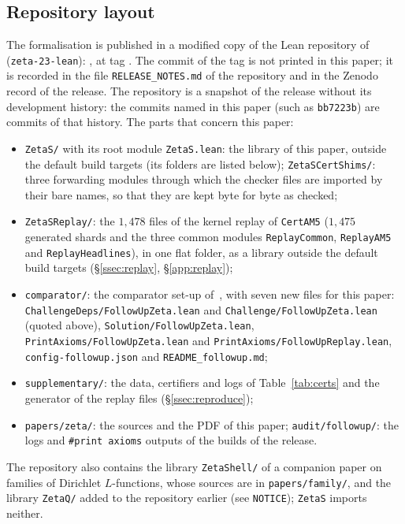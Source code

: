 \subsection{Repository layout}\label{app:layout}
The formalisation is published in a modified copy of the Lean repository of~\cite{AF} (\texttt{zeta-23-lean}): \repourl, at tag
\repotag. The commit of the tag is not printed in this paper; it is recorded in the file \texttt{RELEASE\_NOTES.md} of the repository and in
the Zenodo record of the release. The repository is a snapshot of the release without its development history: the commits named in this paper
(such as \texttt{bb7223b}) are commits of that history. The parts that concern this paper:
\begin{itemize}
\item \texttt{ZetaS/} with its root module \texttt{ZetaS.lean}: the library of this paper, outside the default build targets (its folders are
listed below); \texttt{ZetaSCertShims/}: three forwarding modules through which the checker files are imported by their bare names, so
that they are kept byte for byte as checked;
\item \texttt{ZetaSReplay/}: the $1{,}478$ files of the kernel replay of \texttt{CertAM5} ($1{,}475$ generated shards and the three common
modules \texttt{ReplayCommon}, \texttt{ReplayAM5} and \texttt{ReplayHeadlines}), in one flat folder, as a library outside the default build
targets (\S\ref{ssec:replay}, \S\ref{app:replay});
\item \texttt{comparator/}: the comparator set-up of~\cite{AF}, with seven new files for this paper: \texttt{ChallengeDeps/FollowUpZeta.lean} and
\texttt{Challenge/FollowUpZeta.lean} (quoted above), \texttt{Solution/FollowUpZeta.lean}, \texttt{PrintAxioms/FollowUpZeta.lean} and
\texttt{PrintAxioms/FollowUpReplay.lean}, \texttt{config-followup.json} and \texttt{README\_followup.md};
\item \texttt{supplementary/}: the data, certifiers and logs of Table~\ref{tab:certs} and the generator of the replay files
(\S\ref{ssec:reproduce});
\item \texttt{papers/zeta/}: the sources and the PDF of this paper; \texttt{audit/followup/}: the logs and \texttt{\#print axioms} outputs of
the builds of the release.
\end{itemize}
The repository also contains the library \texttt{ZetaShell/} of a companion paper on families of Dirichlet $L$-functions, whose sources are in
\texttt{papers/family/}, and the library \texttt{ZetaQ/} added to the repository earlier (see \texttt{NOTICE}); \texttt{ZetaS} imports neither.

